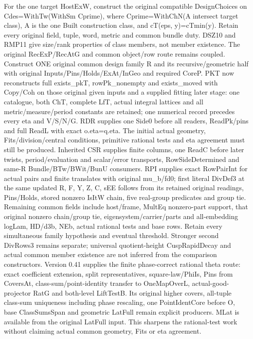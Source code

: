 For the one target HostExW, construct the original compatible DesignChoices on Cdes=WithTw(WithSm Cprime), where Cprime=WithChN(A intersect target class), A is the one Built construction class, and cT(eps,\allowbreak{} y)=cTmin(y). Retain every original field, tuple, word, metric and common bundle duty. DSZ10 and RMP11 give size/\allowbreak{}rank properties of class members, not member existence. The original RecExP/\allowbreak{}RecAtG and common object/\allowbreak{}row route remains coupled. Construct ONE original common design family R and its recursive/\allowbreak{}geometric half with original Inputs/\allowbreak{}Pins/\allowbreak{}Holds/\allowbreak{}ExAt/\allowbreak{}InGeo and required CoreP. PKT now reconstructs full exists\_\allowbreak{}pkT, rowPk\_\allowbreak{}nonempty and exists\_\allowbreak{}moved with Copy/\allowbreak{}Coh on those original given inputs and a supplied fitting later stage: one catalogue, both ChT, complete LfT, actual integral lattices and all metric/\allowbreak{}measure/\allowbreak{}period constants are retained; one numerical record precedes every eta and V/\allowbreak{}S/\allowbreak{}N/\allowbreak{}G. RDR supplies one Side0 before all readers, ReadPk/\allowbreak{}pins and full ReadL with exact o.eta=q.eta. The initial actual geometry, Fits/\allowbreak{}division/\allowbreak{}central conditions, primitive rational tests and eta agreement must still be produced. Inherited CSR supplies finite columns, one ReadC before later twists, period/\allowbreak{}evaluation and scalar/\allowbreak{}error transports, RowSideDetermined and same-R Bundle/\allowbreak{}BTw/\allowbreak{}BWit/\allowbreak{}BunU consumers. RPI supplies exact RowPairInt for actual pairs and finite translates with original mu\_\allowbreak{}b/\allowbreak{}fd0; first literal DivDef3 at the same updated R,\allowbreak{} F,\allowbreak{} Y,\allowbreak{} Z,\allowbreak{} C,\allowbreak{} sEE follows from its retained original readings, Pins/\allowbreak{}Holds, stored nonzero IsItW chain, five real-group predicates and group tie. Remaining common fields include host/\allowbreak{}frame, MultEq nonzero-part support, that original nonzero chain/\allowbreak{}group tie, eigensystem/\allowbreak{}carrier/\allowbreak{}parts and all-embedding logLam, HD/\allowbreak{}d3b, NEb, actual rational tests and base rows. Retain every simultaneous family hypothesis and eventual threshold. Stronger second DivRows3 remains separate; universal quotient-height CuspRapidDecay and actual common member existence are not inferred from the comparison constructors. Version 0.41 supplies the finite phase-correct rational theta route: exact coefficient extension, split representatives, square-law/\allowbreak{}PhiIs, Pins from CoversAt, class-sum/\allowbreak{}point-identity transfer to OneMapOverL, actual-good-projector RatG and both-level LiftTestB. Its original higher covers, all-tuple class-sum uniqueness including phase rescaling, one PointIdentCore before O, base ClassSumsSpan and geometric LatFull remain explicit producers. MLat is available from the original LatFull input. This sharpens the rational-test work without claiming actual common geometry, Fits or eta agreement.


